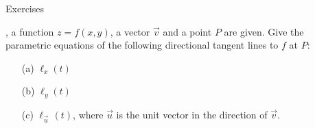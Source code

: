 {\noindent Exercises}
{, a function $z=f(x,y)$, a vector $\vec v$ and a point $P$ are given. Give the parametric equations of the following directional tangent lines to $f$ at $P$:
\begin{enumerate}
	\item [(a)] $\ell_x(t)$
	\item [(b)] $\ell_y(t)$
	\item [(c)] $\ell_{\vec u\,}(t)$, where $\vec u$ is the unit vector in the direction of $\vec v$.
\end{enumerate}
}
